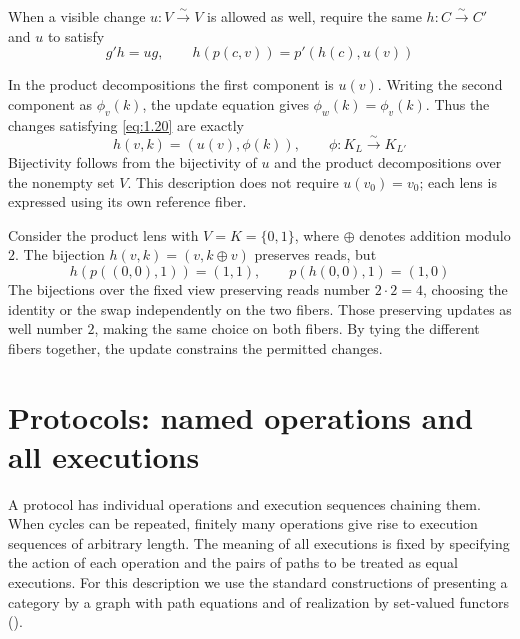 When a visible change $u:V\xrightarrow{\sim}V$ is allowed as well, require
the same $h:C\xrightarrow{\sim}C'$ and $u$ to satisfy
\begin{equation*}
g'h=ug,\qquad h(p(c,v))=p'(h(c),u(v))
\tag{1.20}\label{eq:1.20}
\end{equation*}

In the product decompositions the first component is $u(v)$.
Writing the second component as $\phi_v(k)$, the update equation gives
$\phi_w(k)=\phi_v(k)$. Thus the changes satisfying \eqref{eq:1.20} are exactly
\[
h(v,k)=(u(v),\phi(k)),\qquad \phi:K_L\xrightarrow{\sim}K_{L'}
\]
Bijectivity follows from the bijectivity of $u$ and the product decompositions
over the nonempty set $V$.
This description does not require $u(v_0)=v_0$; each lens is expressed using
its own reference fiber.

\begin{example}\label{ex:1.35}

Consider the product lens with $V=K=\{0,1\}$, where $\oplus$ denotes addition
modulo $2$.
The bijection $h(v,k)=(v,k\oplus v)$ preserves reads, but
\[
h(p((0,0),1))=(1,1),\qquad
p(h(0,0),1)=(1,0)
\]
The bijections over the fixed view preserving reads number $2\cdot2=4$,
choosing the identity or the swap independently on the two fibers.
Those preserving updates as well number $2$, making the same choice on both
fibers.
By tying the different fibers together, the update constrains the permitted
changes.

\end{example}

\section{Protocols: named operations and all executions}\label{sec:1.9}

A protocol has individual operations and execution sequences chaining them.
When cycles can be repeated, finitely many operations give rise to execution
sequences of arbitrary length.
The meaning of all executions is fixed by specifying the action of each
operation and the pairs of paths to be treated as equal executions.
For this description we use the standard constructions of presenting a category
by a graph with path equations and of realization by set-valued functors
(\cite[\href{https://arxiv.org/pdf/1009.1166v3}{\S\S3.2, 3.4--3.5}]{Spivak12}).


